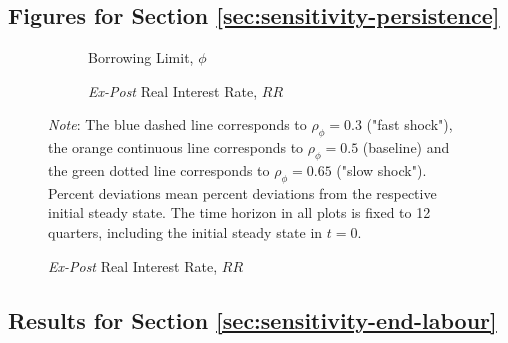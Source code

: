 \documentclass[12pt]{article} %
\numberwithin{equation}{section} %
\numberwithin{figure}{section}
\numberwithin{table}{section}
\begin{document}
\begin{refsection}
\begin{appendices}
\subsection{Figures for Section \ref{sec:sensitivity-persistence}}
\label{sec-app:figures-persistence}

\begin{figure}[H]
    \centering
    \caption{Supplement for Figure \ref{fig:baseline-permanent-limit-duration}}
    \label{fig:baseline-permanent-limit-duration-extra}
     \begin{subfigure}[b]{0.49\textwidth}
     \caption{Borrowing Limit, $\phi$}
     \label{fig:baseline-permanent-limit-duration-phi}
         \centering
         
     \end{subfigure}
     \hfill
     \begin{subfigure}[b]{0.49\textwidth}
     \caption{\textit{Ex-Post} Real Interest Rate, $RR$}
     \label{fig:baseline-permanent-limit-duration-Rr}
         \centering
         
     \end{subfigure}

    \vspace{10pt}
     
     \justifying
     \footnotesize
	\textit{Note}: The blue dashed line corresponds to $\rho_{\phi} = 0.3$ ("fast shock"), the orange continuous line corresponds to $\rho_{\phi} = 0.5$ (baseline) and the green dotted line corresponds to $\rho_{\phi} = 0.65$ ("slow shock"). Percent deviations mean percent deviations from the respective initial steady state. The time horizon in all plots is fixed to 12 quarters, including the initial steady state in $t=0$.
\end{figure}

\subsection{Results for Section \ref{sec:sensitivity-end-labour}}
\label{sec-app:figures-end-L}


\end{appendices}
\end{refsection}
\end{document}
